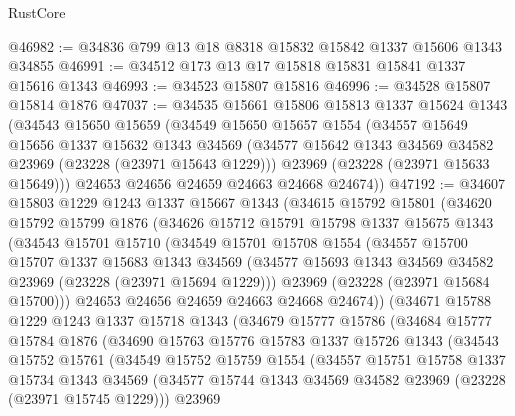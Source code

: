 \begin{lexlean}{RustCore}
\begin{coremodule}
@46982 := @34836 @799 @13 @18 @8318 @15832 @15842 @1337 @15606 @1343 @34855
@46991 := @34512 @173 @13 @17 @15818 @15831 @15841 @1337 @15616 @1343
@46993 := @34523 @15807 @15816
@46996 := @34528 @15807 @15814 @1876
@47037 := @34535
    @15661
    @15806
    @15813
    @1337
    @15624
    @1343
    (@34543
      @15650
      @15659
      (@34549
        @15650
        @15657
        @1554
        (@34557
          @15649
          @15656
          @1337
          @15632
          @1343
          @34569
          (@34577 @15642 @1343 @34569 @34582 @23969 (@23228 (@23971 @15643 @1229)))
          @23969
          (@23228 (@23971 @15633 @15649)))
        @24653
        @24656
        @24659
        @24663
        @24668
        @24674))
@47192 := @34607
    @15803
    @1229
    @1243
    @1337
    @15667
    @1343
    (@34615
      @15792
      @15801
      (@34620
        @15792
        @15799
        @1876
        (@34626
          @15712
          @15791
          @15798
          @1337
          @15675
          @1343
          (@34543
            @15701
            @15710
            (@34549
              @15701
              @15708
              @1554
              (@34557
                @15700
                @15707
                @1337
                @15683
                @1343
                @34569
                (@34577 @15693 @1343 @34569 @34582 @23969 (@23228 (@23971 @15694 @1229)))
                @23969
                (@23228 (@23971 @15684 @15700)))
              @24653
              @24656
              @24659
              @24663
              @24668
              @24674))
          (@34671
            @15788
            @1229
            @1243
            @1337
            @15718
            @1343
            (@34679
              @15777
              @15786
              (@34684
                @15777
                @15784
                @1876
                (@34690
                  @15763
                  @15776
                  @15783
                  @1337
                  @15726
                  @1343
                  (@34543
                    @15752
                    @15761
                    (@34549
                      @15752
                      @15759
                      @1554
                      (@34557
                        @15751
                        @15758
                        @1337
                        @15734
                        @1343
                        @34569
                        (@34577 @15744 @1343 @34569 @34582 @23969 (@23228 (@23971 @15745 @1229)))
                        @23969

\end{coremodule}
\end{lexlean}
